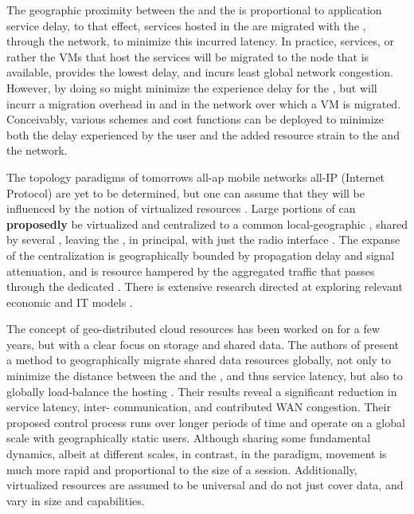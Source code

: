The geographic proximity between the \ue{} and the \dc{} is proportional to application service delay, to that effect, services hosted in the \xcloud{} are migrated with the \ue{}, through the network, to minimize this incurred latency. In practice, services, or rather the VMs that host the services will be migrated to the node that is available, provides the lowest delay, and incurs least global network congestion. However, by doing so might minimize the experience delay for the \ue{}, but will incurr a migration overhead in \dc{} and in the network over which a VM is migrated. Conceivably, various schemes and cost functions can be deployed to minimize both the delay experienced by the user and the added resource strain to the \dc{} and the network.

The topology paradigms of tomorrows all-ap mobile networks all-IP (Internet Protocol) \cite{6144211,5357099} are yet to be determined, but one can assume that they will be influenced by the notion of virtualized resources \cite{baroncelli2010network, chowdhury2009network}. Large portions of \rbss{} can \textbf{proposedly} be virtualized and centralized to a common local-geographic \dc, shared by several \rbss{}, leaving the \rbss{}, in principal, with just the radio interface \cite{melzercloud}. The expanse of the centralization is geographically bounded by propagation delay and signal attenuation, and is resource hampered by the aggregated traffic that passes through the dedicated \dc. There is extensive research directed at exploring relevant economic and IT models \cite{EricssonWhitePaper,6156350, 5357099}.

The concept of geo-distributed cloud resources has been worked on for a few years, but with a clear focus on storage and shared data. The authors of \cite{agarwal2010volley} present a method to geographically migrate shared data resources globally, not only to minimize the distance between the \ue{} and the \dc{}, and thus service latency, but also to globally load-balance the hosting \dcs{}. Their results reveal a significant reduction in service latency, inter-\dc{} communication, and contributed WAN congestion. Their proposed control process runs over longer periods of time and operate on a global scale with geographically static users. Although sharing some fundamental dynamics, albeit at different scales, in contrast, in the \xcloud{} paradigm, \ue{} movement is much more rapid and proportional to the size of a session. Additionally, \xcloud{} virtualized resources are assumed to be universal and do not just cover data, and vary in size and capabilities.

